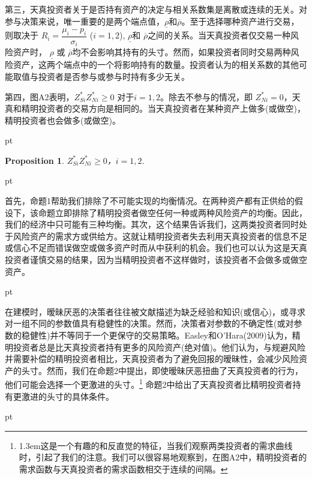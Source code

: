 \documentclass[10.0pt]{article}
\newtheorem{prop}{Proposition}
\begin{document}
第三，天真投资者关于是否持有资产的决定与相关系数集是离散或连续的无关。对参与决策来说，唯一重要的是两个端点值，$ \underline{\rho} $和$ \overline{\rho} $。至于选择哪种资产进行交易，则取决于 $ R_i = \dfrac{\mu_i - p_i}{\sigma_i} $ ($ i = 1, 2 $), $ \underline{\rho} $和 $ \overline{\rho} $之间的关系。当天真投资者仅交易一种风险资产时， $ \underline{\rho} $ 或 $ \overline{\rho} $均不会影响其持有的头寸。然而，如果投资者同时交易两种风险资产，这两个端点中的一个将影响持有的数量。投资者认为的相关系数的其他可能取值与投资者是否参与或参与时持有多少无关。



第四，图A2表明，$ Z_{S i}^* Z_{N i}^* \geqslant 0 $ 对于$ i = 1, 2 $。除去不参与的情况，即 $ Z_{N i}^* = 0 $，天真和精明投资者的交易方向是相同的。当天真投资者在某种资产上做多(或做空)，精明投资者也会做多(或做空)。




 pt

\begin{prop}
$ Z_{S i}^* Z_{N i}^* \geqslant 0 $，$ i = 1, 2 $.
\end{prop}

 pt


首先，命题1帮助我们排除了不可能实现的均衡情况。在两种资产都有正供给的假设下，该命题立即排除了精明投资者做空任何一种或两种风险资产的均衡。因此，我们的经济中只可能有三种均衡。其次，这个结果告诉我们，这两类投资者同时处于风险资产的需求方或供给方。这就让精明投资者失去利用天真投资者的信息不足或信心不足而错误做空或做多资产时而从中获利的机会。我们也可以认为这是天真投资者谨慎交易的结果，因为当精明投资者不这样做时，该投资者不会做多或做空资产。


 pt


在建模时，暧昧厌恶的决策者往往被文献描述为缺乏经验和知识(或信心)，或寻求对一组不同的参数值具有稳健性的决策。然而，决策者对参数的不确定性(或对参数的稳健性)并不等同于一个更保守的交易策略。Easley和O'Hara(2009)认为，精明投资者总是比天真投资者持有更多的风险资产(绝对值)。他们认为，与规避风险并需要补偿的精明投资者相比，天真投资者为了避免回报的暧昧性，会减少风险资产的头寸。然而，我们在命题2中提出，即使暧昧厌恶扭曲了天真投资者的行为，他们可能会选择一个更激进的头寸。\footnote{\baselineskip1.3em这是一个有趣的和反直觉的特征，当我们观察两类投资者的需求曲线时，引起了我们的注意。我们可以很容易地观察到，在图A2中，精明投资者的需求函数与天真投资者的需求函数相交于连续的间隔。} 命题2中给出了天真投资者比精明投资者持有更激进的头寸的具体条件。



 pt
\end{document}
